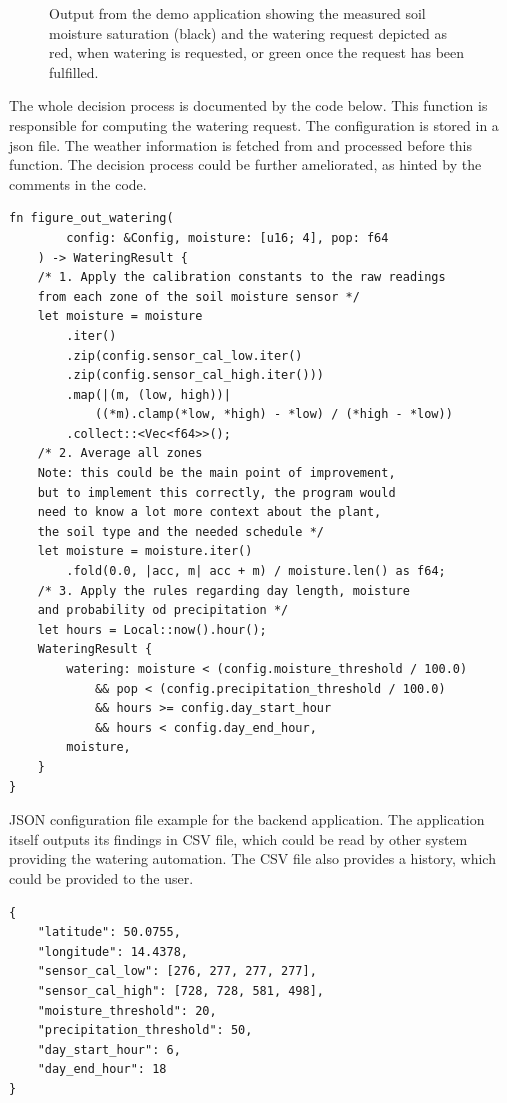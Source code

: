 \begin{figure}[H]
    
    \caption{\label{fig:watering}Output from the demo application showing the measured soil moisture saturation (black) and the watering request depicted as red, when watering is requested, or green once the request has been fulfilled.}
\end{figure}

The whole decision process is documented by the code below. This function is responsible for computing the watering request. The configuration is stored in a json file. The weather information is fetched from  and processed before this function. The decision process could be further ameliorated, as hinted by the comments in the code.
\begin{lstlisting}
fn figure_out_watering(
        config: &Config, moisture: [u16; 4], pop: f64
    ) -> WateringResult {
    /* 1. Apply the calibration constants to the raw readings
    from each zone of the soil moisture sensor */
    let moisture = moisture
        .iter()
        .zip(config.sensor_cal_low.iter()
        .zip(config.sensor_cal_high.iter()))
        .map(|(m, (low, high))| 
            ((*m).clamp(*low, *high) - *low) / (*high - *low))
        .collect::<Vec<f64>>();
    /* 2. Average all zones
    Note: this could be the main point of improvement,
    but to implement this correctly, the program would
    need to know a lot more context about the plant,
    the soil type and the needed schedule */
    let moisture = moisture.iter()
        .fold(0.0, |acc, m| acc + m) / moisture.len() as f64;
    /* 3. Apply the rules regarding day length, moisture
    and probability od precipitation */
    let hours = Local::now().hour();
    WateringResult {
        watering: moisture < (config.moisture_threshold / 100.0)
            && pop < (config.precipitation_threshold / 100.0)
            && hours >= config.day_start_hour 
            && hours < config.day_end_hour,
        moisture,
    }
}
\end{lstlisting}
JSON configuration file example for the backend application. The application itself outputs its findings in CSV file, which could be read by other system providing the watering automation. The CSV file also provides a history, which could be provided to the user.
\begin{lstlisting}
{
    "latitude": 50.0755,
    "longitude": 14.4378,
    "sensor_cal_low": [276, 277, 277, 277],
    "sensor_cal_high": [728, 728, 581, 498],
    "moisture_threshold": 20,
    "precipitation_threshold": 50,
    "day_start_hour": 6,
    "day_end_hour": 18
}
\end{lstlisting}